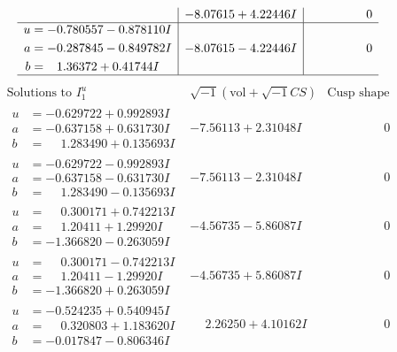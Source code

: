 \documentclass[1p]{elsarticle_modified}
\theoremstyle{definition}
\newcommand{\I}{\sqrt{-1}}
\begin{document}
$$\begin{array}{c|c|c}
 & -8.07615 + 4.22446 I & \phantom{-0.000000 } 0 \\ \hline\begin{aligned}
u &= -0.780557 - 0.878110 I \\
a &= -0.287845 - 0.849782 I \\
b &= \phantom{-}1.36372 + 0.41744 I\end{aligned}
 & -8.07615 - 4.22446 I & \phantom{-0.000000 } 0\\
 \hline 
 \end{array}$$\newpage$$\begin{array}{c|c|c}  
\text{Solutions to }I^u_{1}& \I (\text{vol} + \sqrt{-1}CS) & \text{Cusp shape}\\
 \hline 
\begin{aligned}
u &= -0.629722 + 0.992893 I \\
a &= -0.637158 + 0.631730 I \\
b &= \phantom{-}1.283490 + 0.135693 I\end{aligned}
 & -7.56113 + 2.31048 I & \phantom{-0.000000 } 0 \\ \hline\begin{aligned}
u &= -0.629722 - 0.992893 I \\
a &= -0.637158 - 0.631730 I \\
b &= \phantom{-}1.283490 - 0.135693 I\end{aligned}
 & -7.56113 - 2.31048 I & \phantom{-0.000000 } 0 \\ \hline\begin{aligned}
u &= \phantom{-}0.300171 + 0.742213 I \\
a &= \phantom{-}1.20411 + 1.29920 I \\
b &= -1.366820 - 0.263059 I\end{aligned}
 & -4.56735 - 5.86087 I & \phantom{-0.000000 } 0 \\ \hline\begin{aligned}
u &= \phantom{-}0.300171 - 0.742213 I \\
a &= \phantom{-}1.20411 - 1.29920 I \\
b &= -1.366820 + 0.263059 I\end{aligned}
 & -4.56735 + 5.86087 I & \phantom{-0.000000 } 0 \\ \hline\begin{aligned}
u &= -0.524235 + 0.540945 I \\
a &= \phantom{-}0.320803 + 1.183620 I \\
b &= -0.017847 - 0.806346 I\end{aligned}
 & \phantom{-}2.26250 + 4.10162 I & \phantom{-0.000000 } 0 \\ \hline\begin{aligned}

\end{aligned}
\end{array}$$
\end{document}
